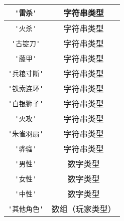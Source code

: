 \begin{center}
\begin{longtable}{|c|c|}
\hline \verb|'雷杀'| & 字符串类型 \\
\hline \verb|'火杀'| & 字符串类型 \\
\hline \verb|'古锭刀'| & 字符串类型 \\
\hline \verb|'藤甲'| & 字符串类型 \\
\hline \verb|'兵粮寸断'| & 字符串类型 \\
\hline \verb|'铁索连环'| & 字符串类型 \\
\hline \verb|'白银狮子'| & 字符串类型 \\
\hline \verb|'火攻'| & 字符串类型 \\
\hline \verb|'朱雀羽扇'| & 字符串类型 \\
\hline \verb|'骅骝'| & 字符串类型 \\

\hline \verb|'男性'| & 数字类型 \\
\hline \verb|'女性'| & 数字类型 \\
\hline \verb|'中性'| & 数字类型 \\

\hline \verb|'其他角色'| & 数组（玩家类型） \\
\hline
\end{longtable}
\end{center}
